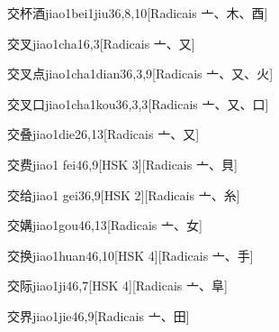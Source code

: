 \begin{entry}{交杯酒}{jiao1bei1jiu3}{6,8,10}[Radicais ⼇、⽊、⾣]
\end{entry}

\begin{entry}{交叉}{jiao1cha1}{6,3}[Radicais ⼇、⼜]
\end{entry}

\begin{entry}{交叉点}{jiao1cha1dian3}{6,3,9}[Radicais ⼇、⼜、⽕]
\end{entry}

\begin{entry}{交叉口}{jiao1cha1kou3}{6,3,3}[Radicais ⼇、⼜、⼝]
\end{entry}

\begin{entry}{交叠}{jiao1die2}{6,13}[Radicais ⼇、⼜]
\end{entry}

\begin{entry}{交费}{jiao1 fei4}{6,9}[HSK 3][Radicais ⼇、⾙]
\end{entry}

\begin{entry}{交给}{jiao1 gei3}{6,9}[HSK 2][Radicais ⼇、⽷]
\end{entry}

\begin{entry}{交媾}{jiao1gou4}{6,13}[Radicais ⼇、⼥]
\end{entry}

\begin{entry}{交换}{jiao1huan4}{6,10}[HSK 4][Radicais ⼇、⼿]
\end{entry}

\begin{entry}{交际}{jiao1ji4}{6,7}[HSK 4][Radicais ⼇、⾩]
\end{entry}

\begin{entry}{交界}{jiao1jie4}{6,9}[Radicais ⼇、⽥]
\end{entry}


